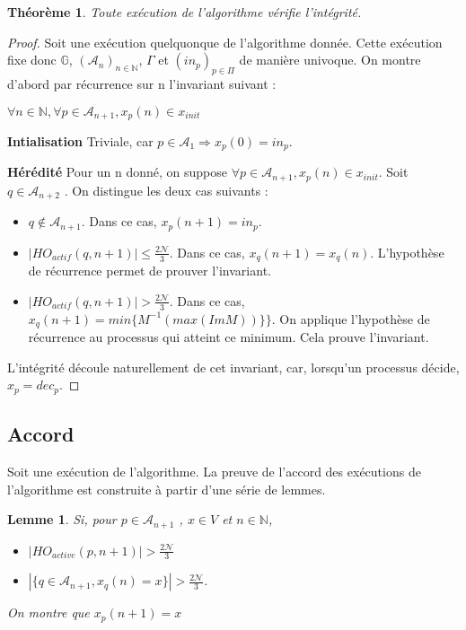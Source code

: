 \documentclass{article}
\newtheorem{lemma}{Lemme}
\newtheorem{theorem}{Théorème}
\begin{document}
\begin{theorem}
	Toute exécution de l'algorithme vérifie l'intégrité.
\end{theorem}
\begin{proof}
	Soit une exécution quelquonque de l'algorithme donnée. Cette exécution fixe donc $\mathds{G}$, $(\mathcal{A}_n)_{n \in \mathds{N}}$, $\Gamma$ et $(in_p)_{p \in \Pi}$ de manière univoque.
	On montre d'abord par récurrence sur n l'invariant suivant : 

	$  \forall n \in \mathds{N}, \forall p \in \mathcal{A}_{n+1}, x_p(n) \in x_{init}$

\textbf{Intialisation}
	Triviale, car $p \in \mathcal{A}_1 \Rightarrow x_p(0) = in_p$. 

\textbf{Hérédité}
	Pour un n donné, on suppose $\forall p \in \mathcal{A}_{n+1}, x_p(n) \in x_{init}$.
Soit $q \in \mathcal{A}_{n+2}$ . On distingue les deux cas suivants :
\begin{itemize}
	\item $q \notin \mathcal{A}_{n+1}$. Dans ce cas, $x_p(n+1) = in_p$.
	\item $|HO_{actif} (q, n+1) | \leq \frac{2\mathcal{N}}{3}$. Dans ce cas, $x_q(n+1) = x_q(n)$. L'hypothèse de récurrence permet de prouver l'invariant.
	\item $|HO_{actif} (q, n+1) | >    \frac{2\mathcal{N}}{3}$. Dans ce cas, $x_q(n+1) = min \{M^{-1} (max (Im M))\}\}$. On applique l'hypothèse de récurrence au processus qui atteint ce minimum.
		Cela prouve l'invariant.

\end{itemize}

L'intégrité découle naturellement de cet invariant, car, lorsqu'un processus décide, $x_p = dec_p$.
\end{proof}

\subsection{Accord}

Soit une exécution de l'algorithme.
La preuve de l'accord des exécutions de l'algorithme est construite à partir d'une série de lemmes.

\begin{lemma}

	Si, pour $p \in \mathcal{A}_{n+1}$ , $x \in V$ et $n \in \mathds{N}$, 

\begin{itemize}

	\item $| HO_{active} (p,n+1) | > \frac{2\mathcal{N}}{3}$
	\item $| \{ q \in \mathcal{A}_{n+1} , x_q(n) = x \} | > \frac{2\mathcal{N}}{3}$.

\end{itemize}

On montre que $x_p(n+1) = x$

\end{lemma}
\end{document}
